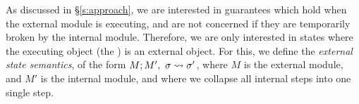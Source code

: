 As discussed in \S \ref{s:approach}, we are interested in guarantees which hold
when the external module is executing, and are not concerned if they are
temporarily broken by the internal module. Therefore, we are only interested in states where the
executing object (the ) is an external object. 
For this, we define the  \emph{external state semantics}, of the form 
$M ; M',\ \sigma \leadsto \sigma'$, where $M$ is the external
module, and $M'$ is the internal module, and where we
collapse all internal steps into one single step.

 


